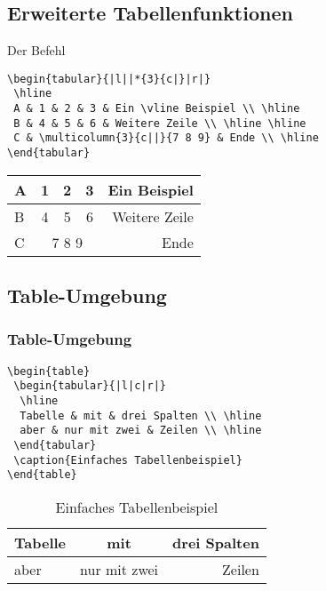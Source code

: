 \subsection{Erweiterte Tabellenfunktionen}
\begin{frame}[fragile]{Der Befehl }
\begin{codeblock}
\begin{verbatim}  
\begin{tabular}{|l||*{3}{c|}|r|}
 \hline
 A & 1 & 2 & 3 & Ein \vline Beispiel \\ \hline
 B & 4 & 5 & 6 & Weitere Zeile \\ \hline \hline
 C & \multicolumn{3}{c||}{7 8 9} & Ende \\ \hline
\end{tabular}
\end{verbatim}
\end{codeblock}\pause
\begin{table}
\center
  \begin{tabular}{|l||*{3}{c|}|r|}
    \hline
    A & 1 & 2 & 3 & Ein \vline Beispiel \\\hline
    B & 4 & 5 & 6 & Weitere Zeile \\\hline \hline
    C & \multicolumn{3}{c||}{7 8 9} & Ende \\\hline
  \end{tabular}
  \end{table}
\end{frame}

\subsection{Table-Umgebung}
\begin{frame}[fragile]
\frametitle{Table-Umgebung}
\begin{small}
\begin{codeblock}
\begin{verbatim}  
\begin{table}
 \begin{tabular}{|l|c|r|}
  \hline
  Tabelle & mit & drei Spalten \\ \hline
  aber & nur mit zwei & Zeilen \\ \hline
 \end{tabular}
 \caption{Einfaches Tabellenbeispiel}
\end{table}
  \end{verbatim} 
  \end{codeblock}
  \end{small}\pause

  \begin{table}
      \begin{tabular}{|l|c|r|}
	\hline
	Tabelle & mit & drei Spalten \\\hline
	aber & nur mit zwei & Zeilen \\\hline
      \end{tabular}
      \caption{Einfaches Tabellenbeispiel}
    \end{table}
\end{frame}
